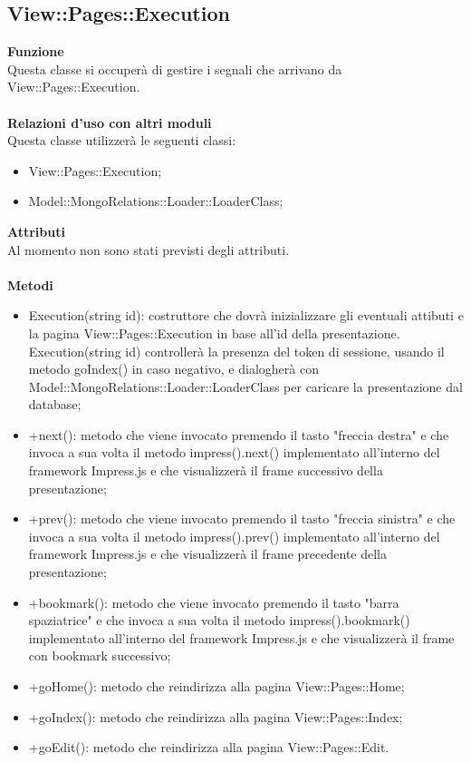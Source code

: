 {				\subsection{View::Pages::Execution}{
					\textbf{Funzione}\\
					\indent Questa classe si occuperà di gestire i segnali che arrivano da View::Pages::Execution.\\\\
					\textbf{Relazioni d'uso con altri moduli}\\
					\indent Questa classe utilizzerà le seguenti classi:
					\begin{itemize}
						\item View::Pages::Execution;
						\item Model::MongoRelations::Loader::LoaderClass;
					\end{itemize}
					\textbf{Attributi}\\
					\indent Al momento non sono stati previsti degli attributi.\\\\
					\textbf{Metodi}
					\begin{itemize}
						\item Execution(string id): costruttore che dovrà inizializzare gli eventuali attibuti e la pagina View::Pages::Execution in base all'id della presentazione. Execution(string id) controllerà la presenza del token di sessione, usando il metodo goIndex() in caso negativo, e dialogherà con Model::MongoRelations::Loader::LoaderClass per caricare la presentazione dal database;
						\item +next(): metodo che viene invocato premendo il tasto "freccia destra" e che invoca a sua volta il metodo impress().next() implementato all'interno del framework Impress.js e che visualizzerà il frame successivo della presentazione;
						\item +prev(): metodo che viene invocato premendo il tasto "freccia sinistra" e che invoca a sua volta il metodo impress().prev() implementato all'interno del framework Impress.js e che visualizzerà il frame precedente della presentazione;
						\item +bookmark(): metodo che viene invocato premendo il tasto "barra spaziatrice" e che invoca a sua volta il metodo impress().bookmark() implementato all'interno del framework Impress.js e che visualizzerà il frame con bookmark successivo;
						\item +goHome(): metodo che reindirizza alla pagina View::Pages::Home;
						\item +goIndex(): metodo che reindirizza alla pagina View::Pages::Index;
						\item +goEdit(): metodo che reindirizza alla pagina View::Pages::Edit.
					\end{itemize}
				}
}
